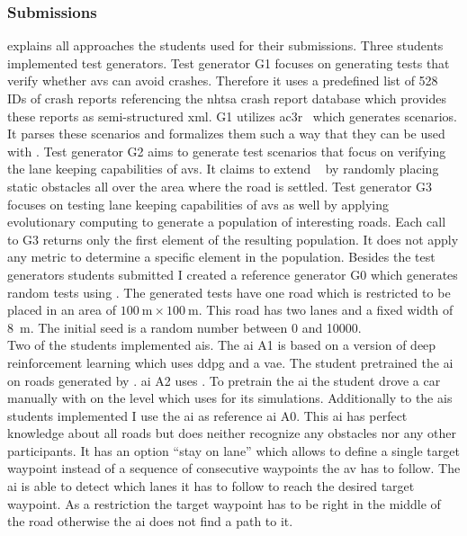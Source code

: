 \subsubsection{Submissions}\label{subsubsec:submissions}
 explains all approaches the students used for their submissions.
Three students implemented test generators.
Test generator G1 focuses on generating tests that verify whether \glspl{av} can avoid crashes.
Therefore it uses a predefined list of \num{528} IDs of crash reports referencing the \gls{nhtsa} crash report database which provides these reports as semi-structured \gls{xml}.
G1 utilizes \gls{ac3r}~\cite{ac3r} which generates \beamng{} scenarios.
It parses these \beamng{} scenarios and formalizes them such a way that they can be used with \drivebuild{}.
Test generator G2 aims to generate test scenarios that focus on verifying the lane keeping capabilities of \glspl{av}.
It claims to extend \asfault{}~\cite{asfault} by randomly placing static obstacles all over the area where the road is settled.
Test generator G3 focuses on testing lane keeping capabilities of \glspl{av} as well by applying evolutionary computing to generate a population of interesting roads.
Each call to G3 returns only the first element of the resulting population.
It does not apply any metric to determine a specific element in the population.
Besides the test generators students submitted I created a reference generator G0 which generates random tests using \asfault{}.
The generated tests have one road which is restricted to be placed in an area of \(\SI{100}{\metre}\times\SI{100}{\metre}\).
This road has two lanes and a fixed width of \SI{8}{\metre}.
The initial seed is a random number between \num{0} and \num{10000}.\\
Two of the students implemented \glspl{ai}.
The \gls{ai} A1 is based on a version of deep reinforcement learning which uses \gls{ddpg} and a \gls{vae}.
The student pretrained the \gls{ai} on roads generated by \asfault{}.
\Gls{ai} A2 uses \deepdriving{}.
To pretrain the \gls{ai} the student drove a car manually with \beamng{} on the level which \drivebuild{} uses for its simulations.
Additionally to the \glspl{ai} students implemented I use the \beamng{} \gls{ai} as reference \gls{ai} A0.
This \gls{ai} has perfect knowledge about all roads but does neither recognize any obstacles nor any other participants.
It has an option \enquote{stay on lane} which allows to define a single target waypoint instead of a sequence of consecutive waypoints the \gls{av} has to follow.
The \gls{ai} is able to detect which lanes it has to follow to reach the desired target waypoint.
As a restriction the target waypoint has to be right in the middle of the road otherwise the \beamng{} \gls{ai} does not find a path to it.
